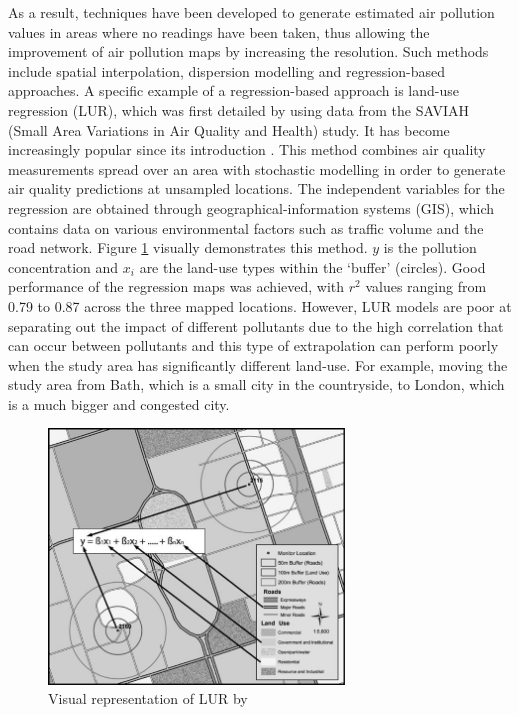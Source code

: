 \documentclass[11pt]{report}
\begin{document}
As a result, techniques have been developed to generate estimated air pollution values in areas where no readings have been taken, thus allowing the improvement of air pollution maps by increasing the resolution. Such methods include spatial interpolation, dispersion modelling and regression-based approaches. A specific example of a regression-based approach is land-use regression (LUR), which was first detailed by \cite{Briggs1997mappingGIS} using data from the SAVIAH (Small Area Variations in Air Quality and Health) study. It has become increasingly popular since its introduction \citep{Hoek2008LUR}. This method combines air quality measurements spread over an area with stochastic modelling in order to generate air quality predictions at unsampled locations. The independent variables for the regression are obtained through geographical-information systems (GIS), which contains data on various environmental factors such as traffic volume and the road network. Figure \ref{LURexplanation} visually demonstrates this method. $y$ is the pollution concentration and $x_i$ are the land-use types within the `buffer' (circles). Good performance of the regression maps was achieved, with $r^2$ values ranging from 0.79 to 0.87 across the three mapped locations. However, LUR models are poor at separating out the impact of different pollutants due to the high correlation that can occur between pollutants \citep{Hoek2008LUR} and this type of extrapolation can perform poorly when the study area has significantly different land-use. For example, moving the study area from Bath, which is a small city in the countryside, to London, which is a much bigger and congested city.

\begin{figure}[!htb]
\centering
\includegraphics[width=0.7\textwidth]{LURexplanation}
\caption{Visual representation of LUR by \cite{Jerrett2005evalmapmodels}}
\label{LURexplanation}
\end{figure}
\end{document}
